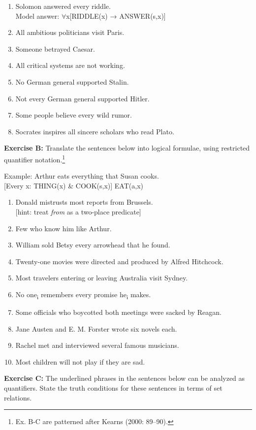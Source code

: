 \begin{enumerate}
\item Solomon answered every riddle.\\
\textsf{Model answer:} ${\forall}$\textsf{x[RIDDLE(x) → ANSWER(s,x)]}
\item All ambitious politicians visit Paris.
\item Someone betrayed Caesar.
\item All critical systems are not working.
\item No German general supported Stalin.
\item Not every German general supported Hitler.
\item Some people believe every wild rumor.
\item Socrates inspires all sincere scholars who read Plato.
\end{enumerate}

\textbf{Exercise B:} Translate the sentences below into logical formulae, using restricted quantifier notation.\footnote{Ex. B-C are patterned after Kearns (2000: 89–90).}

\textsf{Example:}  Arthur eats everything that Susan cooks.\\
\textsf{[Every x: THING(x) \& COOK(s,x)] EAT(a,x)}

\begin{enumerate}
\item Donald mistrusts most reports from Brussels.\\
{}[hint: treat \textit{from} as a two-place predicate]
\item Few who know him like Arthur.
\item William sold Betsy every arrowhead that he found.
\item Twenty-one movies were directed and produced by Alfred Hitchcock.
\item Most travelers entering or leaving Australia visit Sydney.
\item No one\textsubscript{i} remembers every promise he\textsubscript{i} makes.
\item Some officials who boycotted both meetings were sacked by Reagan.
\item Jane Austen and E. M. Forster wrote six novels each.
\item Rachel met and interviewed several famous musicians.
\item Most children will not play if they are sad.
\end{enumerate}
\begin{stylepoints}
\textbf{Exercise C:} The underlined phrases in the sentences below can be analyzed as quantifiers. State the truth conditions for these sentences in terms of set relations.
\end{stylepoints}

